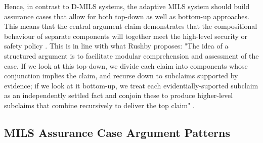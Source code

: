 \documentclass[12pt,twoside,a4paper]{article}
\begin{document}
Hence, in contrast to D-MILS systems, the adaptive MILS system should build assurance cases that allow for both top-down as well as bottom-up approaches. This means that the central argument claim demonstrates that the compositional behaviour of separate components will together meet the high-level security or safety policy \cite{D-MILS-D4.2}. This is in line with what Rushby proposes: "The idea of a structured argument is to facilitate modular comprehension and assessment of the case. If we look at this top-down, we divide each claim into components whose conjunction implies the claim, and recurse down to subclaims supported by evidence; if we look at it bottom-up, we treat each evidentially-suported subclaim as an independently settled fact and conjoin these to produce higher-level subclaims that combine recursively to deliver the top claim" \cite{Rushby15:Evaluation}. 


\subsection{MILS Assurance Case Argument Patterns} \label{sec:assurancecaseargpat}
\end{document}
